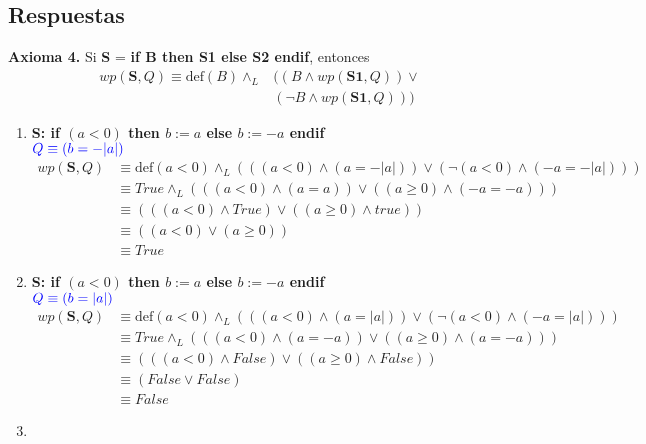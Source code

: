\documentclass{article}
\begin{document}
\subsection*{Respuestas}
\textbf{Axioma 4.} Si \textbf{S} = \textbf{if B then S1 else S2 endif}, entonces\\
\begin{align*}
wp(\textbf{S},Q)\equiv \textrm{def}(B) \wedge_L &((B\wedge wp(\textbf{S1},Q))\vee \\
												&(\neg B\wedge wp(\textbf{S1},Q)))
\end{align*} 
\begin{enumerate}[label=\alph*)]
	\item 
		\textbf{S: if $( a < 0 )$ then $b := a$ else $b := -a$ endif}\\
   		\hspace*{24mm}$\color{blue}Q \equiv (b = -|a|)$\\
   		\begin{align*}
   			wp(\textbf{S},Q)&\equiv \textrm{def}(a < 0)\wedge_L 
   				(((a < 0)\wedge (a=-|a|)) \vee(\neg  (a < 0)\wedge (-a=-|a|)))\\
   							&\equiv True \wedge_L(((a < 0)\wedge (a=a)) 
   								\vee((a\geq 0)\wedge (-a=-a)))\\
   							&\equiv (((a < 0)\wedge True) 
   								\vee((a\geq 0)\wedge true))\\
   							&\equiv ((a < 0) 
   								\vee(a\geq 0))\\
   							&\equiv True
   		\end{align*}
	\item
		\textbf{S: if $( a < 0 )$ then $b := a$ else $b := -a$ endif}\\
   		\hspace*{24mm}$\color{blue}Q \equiv (b = |a|)$\\
   		\begin{align*}
   			wp(\textbf{S},Q)&\equiv \textrm{def}(a < 0)\wedge_L 
   				(((a < 0)\wedge (a=|a|)) \vee(\neg  (a < 0)\wedge (-a=|a|)))\\
   							&\equiv True \wedge_L(((a < 0)\wedge (a=-a)) 
   								\vee((a\geq 0)\wedge (a=-a)))\\
   							&\equiv (((a < 0)\wedge False) 
   								\vee((a\geq 0)\wedge False))\\
   							&\equiv (False 
   								\vee False)\\
   							&\equiv False
   		\end{align*}
	\item

\end{enumerate}
\end{document}
